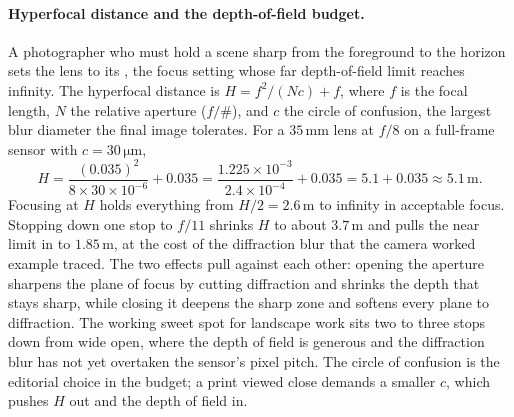 \paragraph{Hyperfocal distance and the depth-of-field budget.} A photographer
who must hold a scene sharp from the foreground to the horizon sets the lens to
its , the focus setting whose far depth-of-field
limit reaches infinity. The hyperfocal distance is
$H = f^{2}/(N c) + f$, where $f$ is the focal length, $N$ the relative aperture
($f/\#$), and $c$ the circle of confusion, the largest blur diameter the
final image tolerates. For a $35\,\si{\milli\meter}$ lens at $f/8$ on a
full-frame sensor with $c = 30\,\si{\micro\meter}$,
\[
H = \frac{(0.035)^{2}}{8\times 30\times 10^{-6}} + 0.035
= \frac{1.225\times 10^{-3}}{2.4\times 10^{-4}} + 0.035
= 5.1 + 0.035 \approx 5.1\,\si{\meter}.
\]
Focusing at $H$ holds everything from $H/2 = 2.6\,\si{\meter}$ to infinity in
acceptable focus. Stopping down one stop to $f/11$ shrinks $H$ to about
$3.7\,\si{\meter}$ and pulls the near limit in to $1.85\,\si{\meter}$, at the
cost of the diffraction blur that the camera worked example traced. The two
effects pull against each other: opening the aperture sharpens the plane of
focus by cutting diffraction and shrinks the depth that stays sharp, while
closing it deepens the sharp zone and softens every plane to diffraction. The
working sweet spot for landscape work sits two to three stops down from wide
open, where the depth of field is generous and the diffraction blur has not yet
overtaken the sensor's pixel pitch. The circle of confusion is the editorial
choice in the budget; a print viewed close demands a smaller $c$, which pushes
$H$ out and the depth of field in.

